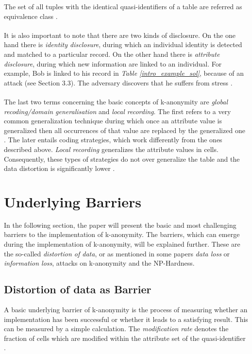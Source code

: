 \documentclass{llncs}
\begin{document}
The set of all tuples with the identical quasi-identifiers of a table are referred as equivalence class \cite{li2006achieving}.\\\\
It is also important to note that there are two kinds of disclosure. On the one hand there is \textit{ identity disclosure}, during which an individual identity is detected and matched to a particular record. On the other hand there is \textit{attribute disclosure}, during which new information are linked to an individual. For example, Bob is linked to his record in \textit{Table \ref{intro_example_sol}}, because of an attack (see Section 3.3). The adversary discovers that he suffers from stress \cite{sweeney2002k}.\\\\
The last two terms concerning the basic concepts of k-anonymity are \textit{global recoding/domain generalisation} and \textit{local recording}. The first refers to a very common generalization technique during which once an attribute value is generalized then all occurrences of that value are replaced by the generalized one  \cite{sweeney2002k,sweeney2002achieving,li2006achieving,incognito}. The later entails coding strategies, which work differently from the ones described above. \textit{Local recording} generalizes the attribute values in cells. Consequently, these types of strategies do not over generalize the table and the data distortion is significantly lower \cite{li2006achieving}. 
 
\section{Underlying Barriers}

In the following section, the paper will present the basic and most challenging barriers to the implementation of k-anonymity. The barriers, which can emerge during the implementation of k-anonymity, will be explained further. These are the so-called \textit{distortion of data}, or as mentioned in some papers \textit{data loss} or \textit{information loss}, attacks on k-anonymity and the NP-Hardness. 
\subsection{Distortion of data as Barrier} \label{sec:Distortion of data as Barrier}

A basic underlying barrier of k-anonymity is the process of measuring whether an implementation has been successful or whether it leads to a satisfying result. This can be measured by a simple calculation. The \textit{modification rate} denotes the fraction of cells which are modified within the attribute set of the quasi-identifier \cite{li2006achieving}.
\end{document}
